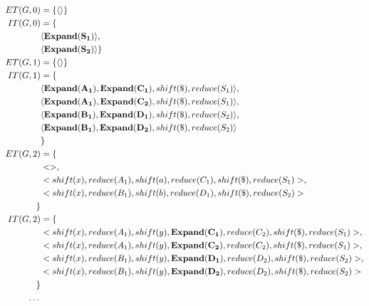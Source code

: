 \documentclass[a4paper,11pt]{article}
\begin{document}
{\small\begin{align*}
ET(G, 0) & = \{ \langle \rangle \}\\
IT(G, 0) & = \{\\
\quad & \langle \mathbf{Expand(S_1)} \rangle,\\
\quad & \langle \mathbf{Expand(S_2)} \rangle \}\\
ET(G, 1) & = \{ \langle \rangle \}\\
IT(G, 1) & = \{ \\
\quad & \langle \mathbf{Expand(A_1)}, \mathbf{Expand(C_1)}, shift(\$), reduce(S_1) \rangle,\\
\quad & \langle \mathbf{Expand(A_1)}, \mathbf{Expand(C_2)}, shift(\$), reduce(S_1) \rangle,\\
\quad & \langle \mathbf{Expand(B_1)}, \mathbf{Expand(D_1)}, shift(\$), reduce(S_2) \rangle, \\
\quad & \langle \mathbf{Expand(B_1)}, \mathbf{Expand(D_2)}, shift(\$), reduce(S_2) \rangle \\
\quad & \}\\
ET(G, 2) & = \{\\
\quad & <>, \\
\quad & <shift(x), reduce(A_1), shift(a), reduce(C_1), shift(\$), reduce(S_1)>,\\
\quad & <shift(x), reduce(B_1), shift(b), reduce(D_1), shift(\$), reduce(S_2)>\\
\}\\
IT(G, 2) & = \{ \\
\quad & <shift(x), reduce(A_1), shift(y), \mathbf{Expand(C_1)}, reduce(C_2), shift(\$), reduce(S_1)>,\\
\quad & <shift(x), reduce(A_1), shift(y), \mathbf{Expand(C_2)}, reduce(C_2), shift(\$), reduce(S_1)>,\\
\quad & <shift(x), reduce(B_1), shift(y), \mathbf{Expand(D_1)}, reduce(D_2), shift(\$), reduce(S_2)>,\\
\quad & <shift(x), reduce(B_1), shift(y), \mathbf{Expand(D_2)}, reduce(D_2), shift(\$), reduce(S_2)>\\
 \}\\
 \textellipsis
\end{align*}}


\end{document}
